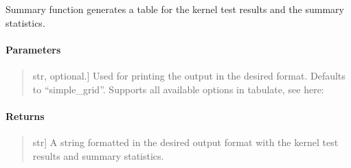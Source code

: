 \documentclass[letterpaper,10pt,english,openany,oneside]{sphinxmanual}
\begin{document}

\begin{fulllineitems}
\label{\detokenize{api_reference/generated/QuadratiK.kernel_test.KernelTest:QuadratiK.kernel_test.KernelTest.summary}}
\pysigstartsignatures
{}
\pysigstopsignatures
\sphinxAtStartPar
Summary function generates a table for the kernel test results and the summary statistics.


\paragraph{Parameters}
\label{\detokenize{api_reference/generated/QuadratiK.kernel_test.KernelTest:id1}}\begin{quote}
\begin{description}
\sphinxlineitem{print\_fmt}{[}str, optional.{]}
\sphinxAtStartPar
Used for printing the output in the desired format. Defaults to “simple\_grid”.
Supports all available options in tabulate, see here: 

\end{description}
\end{quote}


\paragraph{Returns}
\label{\detokenize{api_reference/generated/QuadratiK.kernel_test.KernelTest:id2}}\begin{quote}
\begin{description}
\sphinxlineitem{summary}{[}str{]}
\sphinxAtStartPar
A string formatted in the desired output 
format with the kernel test results and summary statistics.

\end{description}
\end{quote}

\end{fulllineitems}

\end{document}
